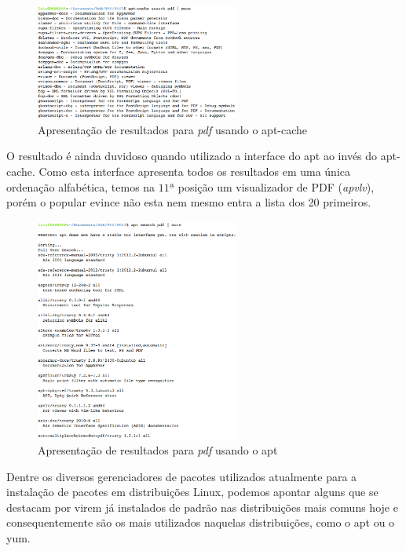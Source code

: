 \begin{figure}[h]
  \centering
	\includegraphics[width=0.6\textwidth]{figuras/search_pdf}
  \caption{Apresentação de resultados para \textit{pdf} usando o {\code apt-cache}}
  \label{fig:figuras_search_pdf}
\end{figure}

O resultado é ainda duvidoso quando utilizado a interface do {\code apt} ao invés do {\code apt-cache}. Como esta interface apresenta todos os resultados em uma única ordenação alfabética, temos na $11ª$ posição um visualizador de PDF (\textit{apvlv}), porém o popular {\code evince} não esta nem mesmo entra a lista dos 20 primeiros.

\begin{figure}[h]
  \centering
	\includegraphics[width=0.6\textwidth]{figuras/search_pdf_ii}
  \caption{Apresentação de resultados para \textit{pdf} usando o {\code apt}}
  \label{fig:figuras_search_pdf_ii}
\end{figure}


Dentre os diversos gerenciadores de pacotes utilizados atualmente para a instalação de pacotes em distribuições Linux, podemos apontar alguns que se destacam por virem já instalados de padrão nas distribuições mais comuns hoje e consequentemente são os mais  utilizados naquelas distribuições, como o {\code apt} ou o {\code yum}.

